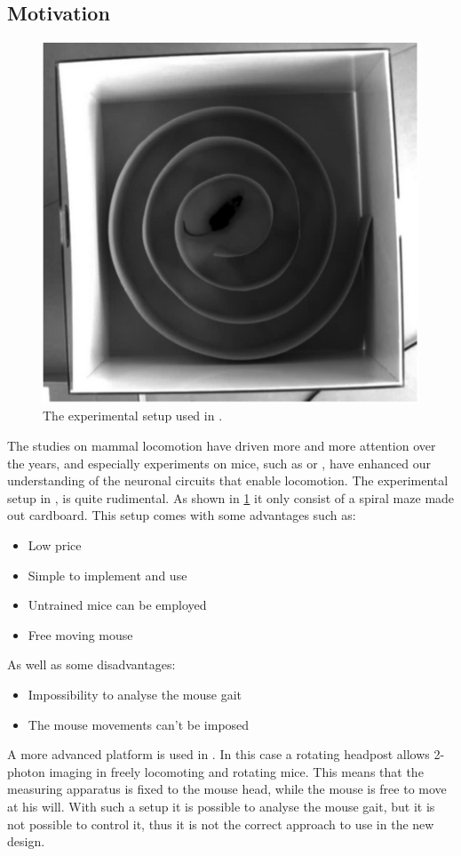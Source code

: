 \documentclass[12pt,a4paper, twoside]{article}
\begin{document}
\subsection{Motivation} \label{sec:mot}
\begin{figure}[H]
	\centering
	\includegraphics[width=0.4\linewidth]{fig/OleSetup.png}
	\caption{The experimental setup used in \cite{Ole}.}\label{fig:OleSetup}
\end{figure}
The studies on mammal locomotion have driven more and more attention over the years, and especially experiments on mice, such as \cite{Ole} or \cite{Neuron}, have enhanced our understanding of the neuronal circuits that enable locomotion. The experimental setup in \cite{Ole}, is quite rudimental. As shown in \ref{fig:OleSetup} it only consist of a spiral maze made out cardboard. This setup comes with some advantages such as:

\begin{itemize}
	\item Low price
	\item Simple to implement and use
	\item Untrained mice can be employed
	\item Free moving mouse
\end{itemize}
As well as some disadvantages:
\begin{itemize}
	\item Impossibility to analyse the mouse gait
	\item The mouse movements can't be imposed
\end{itemize}

A more advanced platform is used in \cite{Neuron}. In this case a rotating headpost allows 2-photon imaging in freely locomoting and rotating mice. This means that the measuring apparatus is fixed to the mouse head, while the mouse is free to move at his will. With such a setup it is possible to analyse the mouse gait, but it is not possible to control it, thus it is not the correct approach to use in the new design.\\
\end{document}
